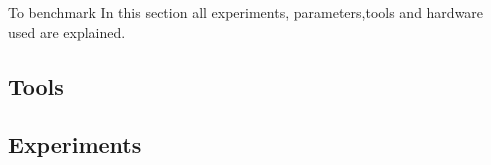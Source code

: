 To benchmark In this section all experiments, parameters,tools and hardware used are explained.  

\subsection{Tools}


\subsection{Experiments}



